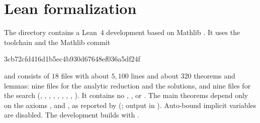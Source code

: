 \documentclass[11pt]{article}
\begin{document}
\section{Lean formalization}\label{sec:lean}

The directory  contains a Lean~4 \cite{Lean4} development based on Mathlib \cite{Mathlib2020}. It uses the toolchain  and the Mathlib commit
\begin{center}\ttfamily 3cb72cfd416d1b5ec4b930d67648ef036a5df24f\end{center}
and consists of $18$ files with about $5{,}100$ lines and about $320$ theorems and lemmas: nine files for the analytic reduction and the solutions, and nine files for the search (, , , , , , , , ).
It contains no , ,  or . The main theorems depend only on the axioms ,  and , as reported by  (; output in ).
Auto-bound implicit variables are disabled.
The development builds with .
\end{document}
